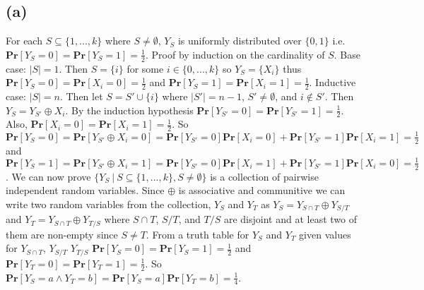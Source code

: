 \documentclass[12pt]{article}
\begin{document}
\subsection*{(a)} For each $S\subseteq \{1,...,k\}$ where $S\neq \emptyset$,
$Y_S$ is uniformly distributed over $\{0,1\}$ i.e.
$\textbf{Pr}[Y_S = 0] = \textbf{Pr}[Y_S = 1] = \frac{1}{2}$.
Proof by induction on the cardinality of $S$. Base case: $|S| = 1$.
Then $S = \{i\}$ for some $i \in \{0,...,k\}$ so $Y_S = \{X_i\}$ thus
$\textbf{Pr}[Y_S = 0] = \textbf{Pr}[X_i = 0] = \frac{1}{2}$ and 
$\textbf{Pr}[Y_S = 1] = \textbf{Pr}[X_i = 1] = \frac{1}{2}$.
Inductive case: $|S| = n$. Then let $S = S' \cup \{i\}$ where
$|S'| = n-1$, $S' \neq \emptyset$, and $i \notin S'$. Then
$Y_S = Y_{S'} \oplus X_i$. By the induction hypothesis 
$\textbf{Pr}[Y_{S'} = 0] = \textbf{Pr}[Y_{S'} = 1] = \frac{1}{2}$. Also,
$\textbf{Pr}[X_i = 0] = \textbf{Pr}[X_i = 1] = \frac{1}{2}$.
So $\textbf{Pr}[Y_S = 0] = \textbf{Pr}[Y_{S'} \oplus X_i = 0] =
\textbf{Pr}[Y_{S'} = 0]\textbf{Pr}[X_i = 0] +
\textbf{Pr}[Y_{S'} = 1]\textbf{Pr}[X_i = 1] = \frac{1}{2}$
and $\textbf{Pr}[Y_S = 1] = \textbf{Pr}[Y_{S'} \oplus X_i = 1] =
\textbf{Pr}[Y_{S'} = 0]\textbf{Pr}[X_i = 1] +
\textbf{Pr}[Y_{S'} = 1]\textbf{Pr}[X_i = 0] = \frac{1}{2}$. We can now prove
$\{Y_S\ |\ S\subseteq \{1,...,k\}, S\neq\emptyset \}$ is a collection of
pairwise independent random variables. Since $\oplus$ is associative and
communitive we can write two random variables from the collection,
$Y_S$ and $Y_T$ as $Y_S = Y_{S\cap T} \oplus Y_{S/T}$ and
$Y_T = Y_{S\cap T} \oplus Y_{T/S}$ where $S\cap T$, $S/T$, and $T/S$ are disjoint
and at least two of them are non-empty since $S \neq T$. From a truth table
for $Y_S$ and $Y_T$ given values for $Y_{S\cap T}$, $Y_{S/T}$ $Y_{T/S}$
$\textbf{Pr}[Y_S = 0] = \textbf{Pr}[Y_S = 1] = \frac{1}{2}$ and
$\textbf{Pr}[Y_T = 0] = \textbf{Pr}[Y_T = 1] = \frac{1}{2}$. So
$\textbf{Pr}[Y_S = a \wedge Y_T = b] = \textbf{Pr}[Y_S = a]\textbf{Pr}[Y_T = b]
= \frac{1}{4}$.
\end{document}
